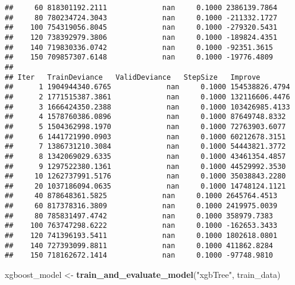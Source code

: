 \documentclass[
]{article}
\newenvironment{Shaded}{\begin{snugshade}}{\end{snugshade}}
\newcommand{\FunctionTok}[1]{\textcolor[rgb]{0.13,0.29,0.53}{\textbf{#1}}}
\newcommand{\NormalTok}[1]{#1}
\newcommand{\OtherTok}[1]{\textcolor[rgb]{0.56,0.35,0.01}{#1}}
\newcommand{\StringTok}[1]{\textcolor[rgb]{0.31,0.60,0.02}{#1}}
\begin{document}
\begin{verbatim}
##     60 818301192.2111             nan     0.1000 2386139.7864
##     80 780234724.3043             nan     0.1000 -211332.1727
##    100 754319056.8045             nan     0.1000 -279320.5431
##    120 738392979.3806             nan     0.1000 -189824.4351
##    140 719830336.0742             nan     0.1000 -92351.3615
##    150 709857307.6148             nan     0.1000 -19776.4809
## 
## Iter   TrainDeviance   ValidDeviance   StepSize   Improve
##      1 1904944340.6765             nan     0.1000 154538826.4794
##      2 1771515387.3861             nan     0.1000 132116606.4476
##      3 1666424350.2388             nan     0.1000 103426985.4133
##      4 1578760386.0896             nan     0.1000 87649748.8332
##      5 1504362998.1970             nan     0.1000 72763903.6077
##      6 1441721990.0903             nan     0.1000 60212678.3151
##      7 1386731210.3084             nan     0.1000 54443821.3772
##      8 1342069029.6335             nan     0.1000 43461354.4857
##      9 1297522380.1361             nan     0.1000 44529992.3530
##     10 1262737991.5176             nan     0.1000 35038843.2280
##     20 1037186094.0635             nan     0.1000 14748124.1121
##     40 878648361.5825             nan     0.1000 2645764.4513
##     60 817378316.3809             nan     0.1000 2419975.0039
##     80 785831497.4742             nan     0.1000 358979.7383
##    100 763747298.6222             nan     0.1000 -162653.3433
##    120 741396193.5411             nan     0.1000 1802618.0801
##    140 727393099.8811             nan     0.1000 411862.8284
##    150 718162672.1414             nan     0.1000 -97748.9810
\end{verbatim}

\begin{Shaded}
\begin{Highlighting}[]
\NormalTok{xgboost\_model }\OtherTok{\textless{}{-}} \FunctionTok{train\_and\_evaluate\_model}\NormalTok{(}\StringTok{"xgbTree"}\NormalTok{, train\_data)}
\end{Highlighting}
\end{Shaded}
\end{document}

